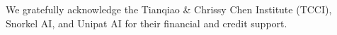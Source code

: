 \begin{ack}
We gratefully acknowledge the Tianqiao \& Chrissy Chen Institute (TCCI), Snorkel AI, and Unipat AI for their financial and credit support.
\end{ack}
